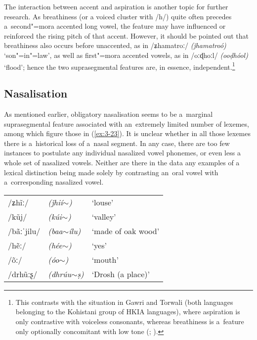 The interaction between accent and aspiration is another topic for further research. As breathiness (or a voiced cluster with /h/) quite often precedes a~second"=mora accented long vowel, the feature may have influenced or reinforced the rising pitch of that accent. However, it should be pointed out that breathiness also occurs before unaccented, as in /ʑhamatroː/ \textit{(ǰhamatroó)} `son"=in"=law', as well as first"=mora accented vowels, as in /oːɖhoːl/ \textit{(ooḍhóol)} `flood'; hence the two suprasegmental features are, in essence, independent.\footnote{This contrasts with the situation in Gawri and Torwali (both languages belonging to the Kohistani group of HKIA languages), where aspiration is only contrastive with voiceless consonants, whereas breathiness is a~feature only optionally concomitant with low tone (\citealt[92]{baart1999b}; \citealt[36--37]{lunsford2001}). } 


\subsection{Nasalisation}
\label{subsec:3-4-2}


As mentioned earlier, obligatory nasalisation seems to be a~marginal suprasegmental feature associated with an~extremely limited number of lexemes, among which figure those in (\ref{ex:3-23}). It is unclear whether in all those lexemes there is a~historical loss of a~nasal segment. In any case, there are too few instances to postulate any individual nasalized vowel phonemes, or even less a whole set of nasalized vowels. Neither are there in the data any examples of a lexical distinction being made solely by contrasting an~oral vowel with a~corresponding nasalized vowel. 


\begin{exe}
\extab
\label{ex:3-23}
\begin{tabularx}{\textwidth}{ l l l }
/ʑh\~{i}ː/ &
\textit{(ǰhií$\sim$) } &
`louse'\\
/kũj/ &
\textit{(kúi$\sim$)} &
`valley'\\
/bãːˈjilu/ &
\textit{(baa$\sim$ílu)} &
`made of oak wood'\\
/hẽː/ &
\textit{(hée$\sim$)} &
`yes'\\
/õː/ &
\textit{(óo$\sim$)} &
`mouth'\\
/drhũːʂ/ &
\textit{(dhrúu$\sim$ṣ)} &
`Drosh (a place)'\\
\end{tabularx}
\end{exe}

